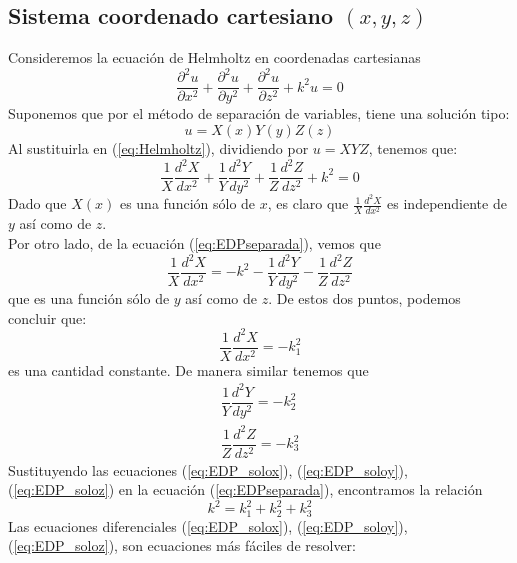 \subsection{Sistema coordenado cartesiano $(x,y,z)$}
Consideremos la ecuación de Helmholtz en coordenadas cartesianas
\begin{equation}
\dfrac{\partial^{2} u}{\partial x^{2}} + \dfrac{\partial^{2} u}{\partial y^{2}} + \dfrac{\partial^{2} u}{\partial z^{2}} + k^{2} u = 0
\label{eq:Helmholtz}
\end{equation}
Suponemos que por el método de separación de variables, tiene una solución tipo:
\begin{equation}
u = X(x)Y(y)Z(z)
\end{equation}
Al sustituirla en (\ref{eq:Helmholtz}), dividiendo por $u=XYZ$, tenemos que:
\begin{equation}
\dfrac{1}{X} \dfrac{d^{2} X}{d x^{2}} + \dfrac{1}{Y} \dfrac{d^{2} Y}{d y^{2}} + \dfrac{1}{Z} \dfrac{d^{2} Z}{d z^{2}} + k^{2} = 0
\label{eq:EDPseparada}
\end{equation}
Dado que $X(x)$ es una función sólo de $x$, es claro que $\frac{1}{X} \frac{d^{2}X}{d x^{2}}$ es independiente de $y$ así como de $z$.
\\
Por otro lado, de la ecuación (\ref{eq:EDPseparada}), vemos que 
\begin{equation}
\dfrac{1}{X} \dfrac{d^{2}X}{d x^{2}} = - k^{2} - \dfrac{1}{Y} \dfrac{d^{2}Y}{dy^{2}} - \dfrac{1}{Z} \dfrac{d^{2}Z}{dz^{2}}
\end{equation}
que es una función sólo de $y$ así como de $z$. De estos dos puntos, podemos concluir que:
\begin{equation}
\dfrac{1}{X} \dfrac{d^{2}X}{d x^{2}} = - k^{2}_{1} \label{eq:EDP_solox}
\end{equation}
es una cantidad constante. De manera similar tenemos que
\begin{eqnarray}
\dfrac{1}{Y} \dfrac{d^{2}Y}{d y^{2}} = - k^{2}_{2} \label{eq:EDP_soloy} \\
\dfrac{1}{Z} \dfrac{d^{2}Z}{d z^{2}} = - k^{2}_{3} \label{eq:EDP_soloz}
\end{eqnarray}
Sustituyendo las ecuaciones (\ref{eq:EDP_solox}), (\ref{eq:EDP_soloy}), (\ref{eq:EDP_soloz}) en la ecuación (\ref{eq:EDPseparada}), encontramos la relación
\begin{equation}
k^{2} = k^{2}_{1} + k^{2}_{2} + k^{2}_{3} \label{eq:sumadek}
\end{equation}
Las ecuaciones diferenciales (\ref{eq:EDP_solox}), (\ref{eq:EDP_soloy}), (\ref{eq:EDP_soloz}), son ecuaciones más fáciles de resolver:
